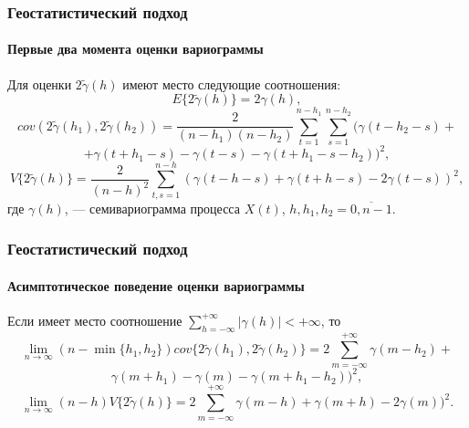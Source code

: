 \documentclass{beamer}
\begin{document}
\begin{frame}
  \frametitle{Геостатистический подход}
  \framesubtitle{Первые два момента оценки вариограммы}
\begin{Theorem}
  Для оценки $ 2 \tilde{\gamma}(h) $ имеют место следующие соотношения:
  \begin{equation*}
    E \{2 \tilde{\gamma}(h) \} = 2 \gamma(h), %
  \end{equation*}
  \begin{equation*}
    cov(2 \tilde{\gamma}(h_1), 2 \tilde{\gamma}(h_2)) = \frac{2}{(n - h_1)(n - h_2)} \sum_{t = 1}^{n - h_1}\sum_{s = 1}^{n - h_2} (\gamma(t - h_2 - s) +
  \end{equation*}
  \begin{equation*}
    + \gamma(t + h_1 - s) - \gamma(t - s) - \gamma(t + h_1 - s - h_2))^2,
  \end{equation*}
  \begin{equation*}
    V \{ 2 \tilde{\gamma}(h) \} = \frac{2}{(n-h)^2}\sum_{t,s = 1}^{n - h} ( \gamma(t - h - s) + \gamma(t + h - s) - 2\gamma(t - s) )^2,
  \end{equation*}
  где $ \gamma(h) $, --- семивариограмма процесса $ X(t) $, $ h, h_1, h_2 = \overline{0, n - 1} $.
\end{Theorem}
\end{frame}

\begin{frame}
  \frametitle{Геостатистический подход}
  \framesubtitle{Асимптотическое поведение оценки вариограммы}
  \begin{Theorem}
  Если имеет место соотношение $ \sum_{h = -\infty}^{+\infty} \vert \gamma(h) \vert < +\infty $, то
  \begin{equation*}
    \lim_{n \to \infty} (n - \min\{ h_1, h_2 \}) cov\{ 2 \tilde{\gamma}(h_1), 2 \tilde{\gamma}(h_2) \} = 2 \sum_{m = -\infty}^{+\infty} \gamma(m - h_2) +
  \end{equation*}
  \begin{equation*}
    \gamma(m + h_1) - \gamma(m) - \gamma(m + h_1 - h_2))^2,
  \end{equation*}
  \begin{equation*}
    \lim_{n \to \infty} (n - h) V\{ 2 \tilde{\gamma}(h) \} = 2 \sum_{m = -\infty}^{+\infty} \gamma(m - h) + \gamma(m + h) - 2 \gamma(m))^2.
  \end{equation*}
\end{Theorem}
\end{frame}
\end{document}
